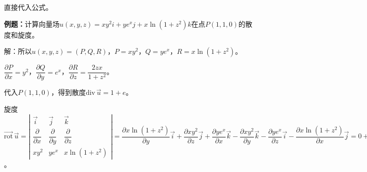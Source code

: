 直接代入公式。

\textbf{例题：}计算向量场$u(x,y,z)=xy^2i+ye^xj+x\ln(1+z^2)k$在点$P(1,1,0)$的散度和旋度。

解：所以$u(x,y,z)=(P,Q,R)$，$P=xy^2$，$Q=ye^x$，$R=x\ln(1+z^2)$。

$\dfrac{\partial P}{\partial x}=y^2$，$\dfrac{\partial Q}{\partial y}=e^x$，$\dfrac{\partial R}{\partial z}=\dfrac{2zx}{1+z^2}$。

代入$P(1,1,0)$，得到散度$\textrm{div}\,\vec{u}=1+e$。

旋度$\overrightarrow{\textrm{rot}}\,\vec{u}=\left\vert\begin{array}{ccc}
    \vec{i} & \vec{j} & \vec{k} \\
    \dfrac{\partial}{\partial x} & \dfrac{\partial}{\partial y} & \dfrac{\partial}{\partial z} \\
    xy^2 & ye^x & x\ln(1+z^2)
\end{array}\right\vert=\dfrac{\partial x\ln(1+z^2)}{\partial y}\vec{i}+\dfrac{\partial xy^2}{\partial z}\vec{j}+\dfrac{\partial ye^x}{\partial x}\vec{k}-\dfrac{\partial xy^2}{\partial y}\vec{k}-\dfrac{\partial ye^x}{\partial z}\vec{i}-\dfrac{\partial x\ln(1+z^2)}{\partial x}\vec{j}=0+0+ye^x\vec{k}-2xy\vec{k}-0-\ln(1+z^2)\vec{j}=-\ln(1+z^2)\vec{j}+(ye^x-2xy)\vec{k}=(0,0,e-2)$。
